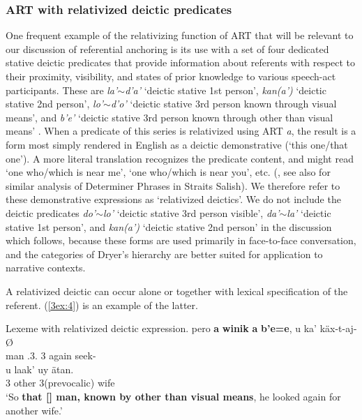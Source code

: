 \documentclass[output=paper]{langsci/langscibook}
\begin{document}
\subsubsection{ART with relativized deictic predicates}\label{3sec:211}

One frequent example of the relativizing function of ART that will be relevant to our discussion of referential anchoring is its use with a set of four dedicated stative deictic predicates that provide information about referents with respect to their proximity, visibility, and states of prior knowledge to various speech-act participants.  These are {\emph{la'$\sim$d'a'}} `deictic stative 1st person', {\emph{kan(a')}} `deictic stative 2nd person', {\emph{lo'$\sim$d'o'}} `deictic stative 3rd person known through visual means', and {\emph{b'e'}} `deictic stative 3rd person known through other than visual means' \citep{danziger:94}.  When a predicate of this series is relativized using ART {\emph{a}}, the result is a form most simply rendered in English as a deictic demonstrative (`this one/that one').  A more literal translation recognizes the predicate content, and might read `one who/which is near me', `one who/which is near you', etc. (\citealt[][891-894]{danziger:94}, see also \citealt[][489-490]{jelinek:95} for similar analysis of Determiner Phrases in Straits Salish).  We therefore refer to these demonstrative expressions as `relativized deictics'.  We do not include the deictic predicates {\emph{do'$\sim$lo'}} `deictic stative 3rd person visible', {\emph{da'$\sim$la'}} `deictic stative 1st person', and {\emph{kan(a')}} `deictic stative 2nd person' in the discussion which follows, because these forms are used primarily in face-to-face conversation, and the categories of Dryer's hierarchy are better suited for application to narrative contexts.

A relativized deictic can occur alone or together with lexical specification of the referent. (\ref{3ex:4}) is an example of the latter.

\begin{samepage}
\begin{exe}
\ex\label{3ex:4}
Lexeme with relativized deictic expression. 
\exi{}
\gll	pero 		{\bf{a}} 	{\bf{winik}} 	{\bf{a}} 	{\bf{b'e=e}}, 				u 		ka'		k\"ax-t-aj-\O  \\
	{}	{}	man			{}	{}.3.{}	3{}	again	seek-{} \\
\glt
\exi{}
\gll	u 		laak' 		uy				\"atan. \\
	3{}	other		3{}(prevocalic)	wife \\
\glt	`So {\bf{that [{}] man, known by other than visual means}}, he looked again for another wife.'
\end{exe}
\end{samepage}
\end{document}
